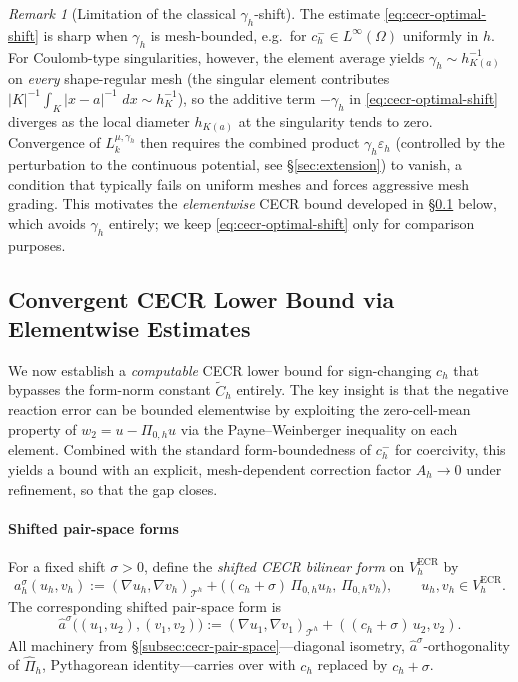\documentclass[11pt]{article}
\theoremstyle{plain}
\theoremstyle{definition}
\theoremstyle{remark}
\newtheorem{remark}{Remark}
\newcommand{\dx}{\,dx}
\newcommand{\ECR}{\mathrm{ECR}}
\begin{document}
\begin{remark}[Limitation of the classical $\gamma_h$-shift]
\label{rmk:gamma-h-limitation}
The estimate \eqref{eq:cecr-optimal-shift} is sharp when $\gamma_h$
is mesh-bounded, e.g.\ for $c_h^-\in L^\infty(\Omega)$ uniformly in
$h$.  For Coulomb-type singularities, however, the element average
yields $\gamma_h\sim h_{K(a)}^{-1}$ on \emph{every} shape-regular mesh
(the singular element contributes
$|K|^{-1}\int_K |x-a|^{-1}\,\dx\sim h_K^{-1}$), so the additive
term $-\gamma_h$ in \eqref{eq:cecr-optimal-shift} diverges as
the local diameter $h_{K(a)}$ at the singularity tends to zero.
Convergence of $L_k^{\mu,\gamma_h}$ then requires the
combined product $\gamma_h\varepsilon_h$ (controlled by the
perturbation to the continuous potential, see \S\ref{sec:extension})
to vanish, a condition that typically fails on uniform meshes and
forces aggressive mesh grading.  This motivates the \emph{elementwise} CECR bound developed in
\S\ref{subsec:cecr-convergent} below, which avoids $\gamma_h$ entirely;
we keep \eqref{eq:cecr-optimal-shift} only for comparison purposes.
\end{remark}

\subsection{Convergent CECR Lower Bound via Elementwise Estimates}
\label{subsec:cecr-convergent}

We now establish a \emph{computable} CECR lower bound for
sign-changing $c_h$ that bypasses the form-norm constant
$\widetilde C_h$ entirely. The key insight is that the negative
reaction error can be bounded elementwise by exploiting the
zero-cell-mean property of $w_2=u-\Pi_{0,h}u$ via the
Payne--Weinberger inequality on each element. Combined with the
standard form-boundedness of $c_h^-$ for coercivity, this yields
a bound with an explicit, mesh-dependent correction factor $A_h\to 0$
under refinement, so that the gap closes.

\paragraph{Shifted pair-space forms}
For a fixed shift $\sigma>0$, define the \emph{shifted CECR bilinear
form} on $V_h^{\ECR}$ by
\begin{equation}
\label{eq:shifted-cecr}
  a_h^\sigma(u_h,v_h)
  :=
  (\nabla u_h,\nabla v_h)_{\mathcal{T}^h}
  + \bigl((c_h{+}\sigma)\,\Pi_{0,h}u_h,\,\Pi_{0,h}v_h\bigr),
  \qquad u_h,v_h\in V_h^{\ECR}.
\end{equation}
The corresponding shifted pair-space form is
\begin{equation}
\label{eq:shifted-pair-forms}
  \widehat a^\sigma\bigl((u_1,u_2),(v_1,v_2)\bigr)
  := (\nabla u_1,\nabla v_1)_{\mathcal{T}^h}
     + ((c_h{+}\sigma)\,u_2,v_2).
\end{equation}
All machinery from \S\ref{subsec:cecr-pair-space}---diagonal isometry,
$\widehat a^\sigma$-orthogonality of $\widehat\Pi_h$, Pythagorean
identity---carries over with $c_h$ replaced by $c_h+\sigma$.
\end{document}
